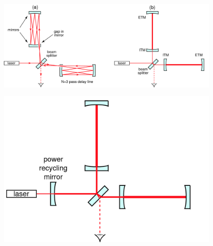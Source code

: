 

\begin{figure}[]
\begin{center}
\includegraphics[width=1\columnwidth]{./figures/fig5e/fig5e}
\caption{ \protect}
\end{center}
\end{figure}


\begin{figure}[]
\begin{center}
\includegraphics[width=1\columnwidth]{./figures/fig6a/fig6a}
\caption{ \protect}
\end{center}
\end{figure}


